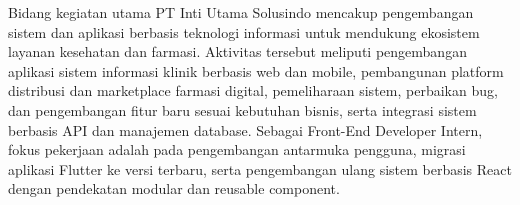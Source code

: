 \documentclass[12pt, a4paper]{article}
\begin{document}
Bidang kegiatan utama PT Inti Utama Solusindo mencakup pengembangan sistem dan aplikasi berbasis teknologi informasi untuk mendukung ekosistem layanan kesehatan dan farmasi. Aktivitas tersebut meliputi pengembangan aplikasi sistem informasi klinik berbasis web dan mobile, pembangunan platform distribusi dan marketplace farmasi digital, pemeliharaan sistem, perbaikan bug, dan pengembangan fitur baru sesuai kebutuhan bisnis, serta integrasi sistem berbasis API dan manajemen database. Sebagai Front-End Developer Intern, fokus pekerjaan adalah pada pengembangan antarmuka pengguna, migrasi aplikasi Flutter ke versi terbaru, serta pengembangan ulang sistem berbasis React dengan pendekatan modular dan reusable component.\\
\end{document}
